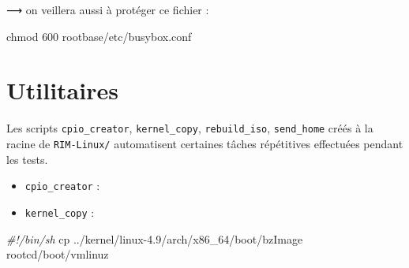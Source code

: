 \documentclass[]{article}
\newenvironment{Shaded}{}{}
\newcommand{\KeywordTok}[1]{\textcolor[rgb]{0.00,0.44,0.13}{\textbf{{#1}}}}
\newcommand{\StringTok}[1]{\textcolor[rgb]{0.25,0.44,0.63}{{#1}}}
\newcommand{\CommentTok}[1]{\textcolor[rgb]{0.38,0.63,0.69}{\textit{{#1}}}}
\newcommand{\FunctionTok}[1]{\textcolor[rgb]{0.02,0.16,0.49}{{#1}}}
\newcommand{\VariableTok}[1]{\textcolor[rgb]{0.10,0.09,0.49}{{#1}}}
\newcommand{\OperatorTok}[1]{\textcolor[rgb]{0.40,0.40,0.40}{{#1}}}
\newcommand{\BuiltInTok}[1]{{#1}}
\newcommand{\NormalTok}[1]{{#1}}
\providecommand{\tightlist}{%
  \setlength{\itemsep}{0pt}\setlength{\parskip}{0pt}}
\begin{document}
⟶ on veillera aussi à protéger ce fichier :

\begin{Shaded}
\begin{Highlighting}[]
\FunctionTok{chmod} \NormalTok{600 rootbase/etc/busybox.conf}
\end{Highlighting}
\end{Shaded}

\section{Utilitaires}\label{utilitaires}

Les scripts \texttt{cpio\_creator}, \texttt{kernel\_copy},
\texttt{rebuild\_iso}, \texttt{send\_home} créés à la racine de
\texttt{RIM-Linux/} automatisent certaines tâches répétitives effectuées
pendant les tests.

\begin{itemize}
\tightlist
\item
  \texttt{cpio\_creator} :
\end{itemize}

\begin{Shaded}
\end{Shaded}

\begin{itemize}
\tightlist
\item
  \texttt{kernel\_copy} :
\end{itemize}

\begin{Shaded}
\begin{Highlighting}[]

\CommentTok{#!/bin/sh}
\FunctionTok{cp} \NormalTok{../kernel/linux-4.9/arch/x86_64/boot/bzImage rootcd/boot/vmlinuz}
\end{Highlighting}
\end{Shaded}
\end{document}
